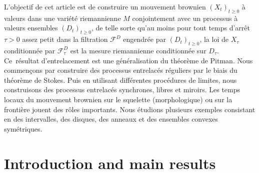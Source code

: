 \documentclass[JEP,XML,SOM,Unicode,NoFloatCountersInSection,published]{cedram}
\theoremstyle{plain}
\theoremstyle{definition}
\begin{document}




\begin{altabstract}
L'objectif de cet article est de construire un mouvement brownien $(X_t)_{t\geq 0}$ à valeurs dans une variété riemannienne $M$ conjointement avec un processus à valeurs ensembles $(D_t)_{t\geq 0}$, de telle sorte qu'au moins pour tout temps d'arrêt $\tau>0$ assez petit dans la filtration $\mathcal{F}^D$ engendrée par $(D_t)_{t\geq 0}$, la loi de $X_{\tau}$ conditionnée par $\mathcal{F}^D_\tau$ est la mesure riemannienne conditionnée sur $D_\tau$. Ce~résultat d'entrelacement est une généralisation du théorème de Pitman. Nous commençons par construire des processus entrelacés réguliers par le biais du théorème de Stokes. Puis en utilisant différentes procédures de limites, nous construisons des processus entrelacés synchrones, libres et miroirs. Les temps locaux du mouvement brownien sur le squelette (morphologique) ou sur la frontière jouent des rôles importants.
Nous étudions plusieurs exemples consistant en des intervalles, des disques, des anneaux et des ensembles convexes symétriques.
\end{altabstract}

\maketitle
\vspace*{-\baselineskip}
\tableofcontents


\section{Introduction and main results}
\label{Section0}
\end{document}
